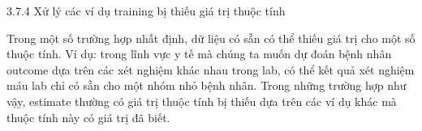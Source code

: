3.7.4 Xử lý các ví dụ training bị thiếu giá trị thuộc tính

Trong một số trường hợp nhất định, dữ liệu có sẵn có thể thiếu giá trị cho một số thuộc tính. Ví dụ: trong lĩnh vực y tế mà chúng ta muốn dự đoán bệnh nhân outcome dựa trên các xét nghiệm khác nhau trong lab, có thể kết quả xét nghiệm máu lab chỉ có sẵn cho một nhóm nhỏ bệnh nhân. Trong những trường hợp như vậy, estimate thường có giá trị thuộc tính bị thiếu dựa trên các ví dụ khác mà thuộc tính này có giá trị đã biết.

